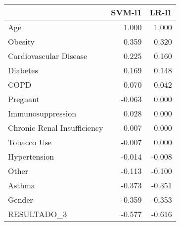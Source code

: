\begin{tabular}{lrr}
\toprule
{} &  SVM-l1 &  LR-l1 \\
\midrule
Age                         &   1.000 &  1.000 \\
Obesity                     &   0.359 &  0.320 \\
Cardiovascular Disease      &   0.225 &  0.160 \\
Diabetes                    &   0.169 &  0.148 \\
COPD                        &   0.070 &  0.042 \\
Pregnant                    &  -0.063 &  0.000 \\
Immunosuppression           &   0.028 &  0.000 \\
Chronic Renal Insufficiency &   0.007 &  0.000 \\
Tobacco Use                 &  -0.007 &  0.000 \\
Hypertension                &  -0.014 & -0.008 \\
Other                       &  -0.113 & -0.100 \\
Asthma                      &  -0.373 & -0.351 \\
Gender                      &  -0.359 & -0.353 \\
RESULTADO\_3                 &  -0.577 & -0.616 \\
\bottomrule
\end{tabular}
